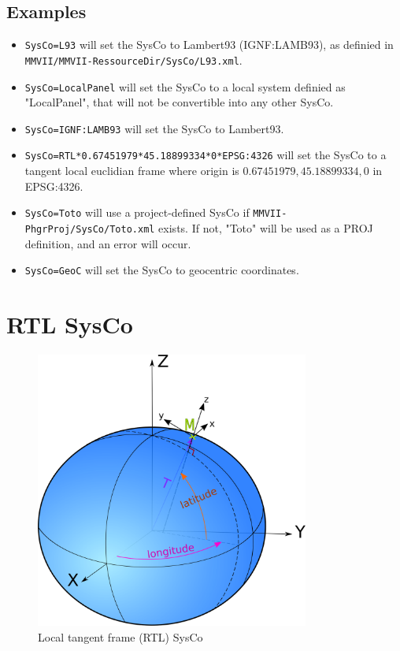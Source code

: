 \subsection{Examples}
\begin{itemize}
\item {\tt SysCo=L93} will set the SysCo to Lambert93 (IGNF:LAMB93), as definied in \\
{\tt MMVII/MMVII-RessourceDir/SysCo/L93.xml}.
\item {\tt SysCo=LocalPanel} will set the SysCo to a local system definied as "LocalPanel", that will not be convertible into any other SysCo.
\item {\tt SysCo=IGNF:LAMB93} will set the SysCo to Lambert93.
\item {\tt SysCo=RTL*0.67451979*45.18899334*0*EPSG:4326} will set the SysCo to a tangent local euclidian frame where origin is $0.67451979, 45.18899334, 0$ in EPSG:4326.
\item {\tt SysCo=Toto} will use a project-defined SysCo if {\tt MMVII-PhgrProj/SysCo/Toto.xml} exists. If not, "Toto" will be used as a PROJ definition, and an error will occur.
\item {\tt SysCo=GeoC} will set the SysCo to geocentric coordinates.

\end{itemize}


\section{RTL SysCo}
\label{SysCoRTL}

\begin{figure}[h!]
\centering
\includegraphics[width=9cm]{CommandReferences/ImagesComRef/cart_geocentr.png}
\caption{Local tangent frame (RTL) SysCo}
\label{fig:RTL}
\end{figure}


